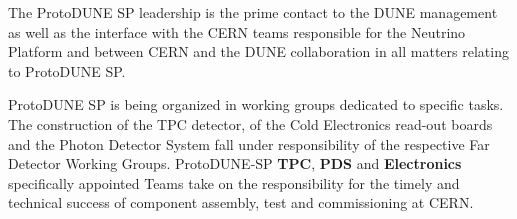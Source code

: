 \documentclass[11pt, oneside]{article}   	%
\begin{document}
The ProtoDUNE SP leadership is the prime contact to the DUNE management as well as the interface with the CERN teams responsible for the Neutrino Platform and between CERN and the DUNE collaboration in all matters relating to ProtoDUNE SP.

ProtoDUNE SP is being organized in working groups dedicated to specific tasks. The construction of the TPC detector, of the Cold Electronics read-out boards and the Photon Detector System fall under responsibility of the respective Far Detector Working Groups. ProtoDUNE-SP {\bf TPC}, {\bf PDS} and {\bf Electronics} specifically appointed Teams take on the responsibility for the timely and technical success of component assembly, test and commissioning at CERN.




\end{document}
